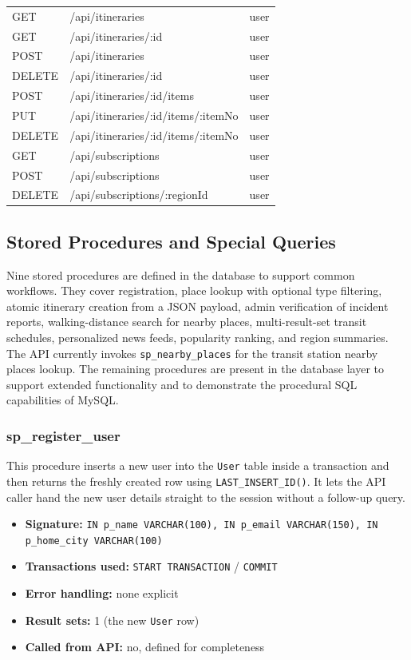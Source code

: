 \begin{table}[H]
\begin{tabularx}{\textwidth}{l X l}
        GET & /api/itineraries & user \\
        GET & /api/itineraries/:id & user \\
        POST & /api/itineraries & user \\
        DELETE & /api/itineraries/:id & user \\
        POST & /api/itineraries/:id/items & user \\
        PUT & /api/itineraries/:id/items/:itemNo & user \\
        DELETE & /api/itineraries/:id/items/:itemNo & user \\
        GET & /api/subscriptions & user \\
        POST & /api/subscriptions & user \\
        DELETE & /api/subscriptions/:regionId & user \\
        \bottomrule
    \end{tabularx}
\end{table}

\subsection{Stored Procedures and Special Queries}

Nine stored procedures are defined in the database to support common workflows. They cover registration, place lookup with optional type filtering, atomic itinerary creation from a JSON payload, admin verification of incident reports, walking-distance search for nearby places, multi-result-set transit schedules, personalized news feeds, popularity ranking, and region summaries. The API currently invokes \texttt{sp\_nearby\_places} for the transit station nearby places lookup. The remaining procedures are present in the database layer to support extended functionality and to demonstrate the procedural SQL capabilities of MySQL.

\subsubsection{sp\_register\_user}

This procedure inserts a new user into the \texttt{User} table inside a transaction and then returns the freshly created row using \texttt{LAST\_INSERT\_ID()}. It lets the API caller hand the new user details straight to the session without a follow-up query.

\begin{itemize}
    \item \textbf{Signature:} \texttt{IN p\_name VARCHAR(100), IN p\_email VARCHAR(150), IN p\_home\_city VARCHAR(100)}
    \item \textbf{Transactions used:} \texttt{START TRANSACTION} / \texttt{COMMIT}
    \item \textbf{Error handling:} none explicit
    \item \textbf{Result sets:} 1 (the new \texttt{User} row)
    \item \textbf{Called from API:} no, defined for completeness
\end{itemize}

